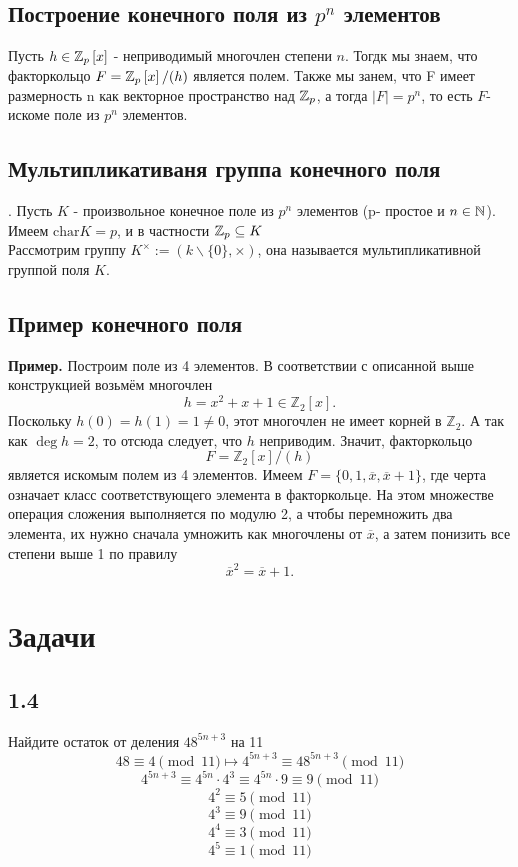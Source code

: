 \subsection{Построение конечного поля из $p^n$ элементов}
Пусть $h\in\mathbb{Z}_p\left[x\right]$ - неприводимый многочлен степени $n$. Тогдк мы знаем, что факторкольцо $F = \mathbb{Z}_p\left[x\right]/(h)$ является полем. Также мы занем, что F имеет размерность n как векторное пространство над $\mathbb{Z}_p$, а тогда $|F| = p^n$, то есть $F$- искоме поле из $p^n$ элементов. 
\subsection{Мультипликативаня группа конечного поля}.
Пусть $K$ - произвольное конечное поле из $p^n$ элементов (p- простое и $n\in\mathbb{N}$). Имеем $\text{char} K = p$, и в частности $\mathbb{Z}_p\subseteq K$\\
Рассмотрим группу $K^{\times} := (k\backslash\{0\}, \times)$, она называется мультипликативной группой поля $K$.
\subsection{Пример конечного поля}
\textbf{Пример.} Построим поле из 4 элементов. В соответствии с описанной выше конструкцией возьмём многочлен 
\[
h = x^2 + x + 1 \in \mathbb{Z}_2[x].
\]
Поскольку \( h(0) = h(1) = 1 \neq 0 \), этот многочлен не имеет корней в \(\mathbb{Z}_2\). А так как \(\deg h = 2\), то отсюда следует, что \( h \) неприводим. Значит, факторкольцо 
\[
F = \mathbb{Z}_2[x]/(h)
\]
является искомым полем из 4 элементов. Имеем \( F = \{0, 1, \overline{x}, \overline{x} + 1\} \), где черта означает класс соответствующего элемента в факторкольце. На этом множестве операция сложения выполняется по модулю 2, а чтобы перемножить два элемента, их нужно сначала умножить как многочлены от \(\overline{x}\), а затем понизить все степени выше 1 по правилу 
\[
\overline{x}^2 = \overline{x} + 1.
\]
\section{Задачи}
\subsection{1.4}
Найдите остаток от деления $48^{5n+3}$ на 11 \\
$$48 \equiv 4 \pmod{11}\longmapsto 4^{5n+3}\equiv 48^{5n+3} \pmod{11}  $$
$$4^{5n+3} \equiv  4^{5n}\cdot 4^3 \equiv 4^{5n}\cdot 9 \equiv 9 \pmod{11} $$
$$4^2 \equiv 5 \pmod{11}$$  
$$4^3 \equiv 9 \pmod{11} $$
$$4^4 \equiv 3\pmod{11} $$
$$4^5 \equiv 1 \pmod{11}$$


